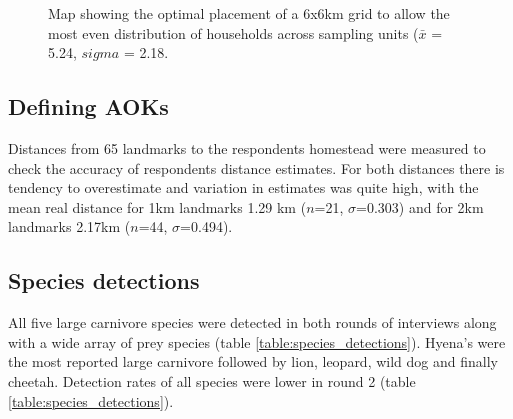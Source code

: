 \begin{figure}[h]
\centering
\setlength\fboxsep{0pt}
\setlength\fboxrule{0.5pt}
\caption{Map showing the optimal placement of a 6x6km grid to allow the most even distribution of households across sampling units ($\bar{x}$ = 5.24, $sigma$ = 2.18.}
\label{fig:6km_grid_place}
\end{figure}
 

\subsection*{Defining AOKs}
Distances from 65 landmarks to the respondents homestead were measured to check the accuracy of respondents distance estimates. For both distances there is tendency to overestimate and variation in estimates was quite high, with the mean real distance for 1km landmarks 1.29 km ($n$=21, $\sigma$=0.303) and for 2km landmarks 2.17km ($n$=44, $\sigma$=0.494).

\subsection*{Species detections}

All five large carnivore species were detected in both rounds of interviews along with a wide array of prey species (table \ref{table:species_detections}). Hyena's were the most reported large carnivore followed by lion, leopard, wild dog and finally cheetah. Detection rates of all species were lower in round 2 (table \ref{table:species_detections}).

